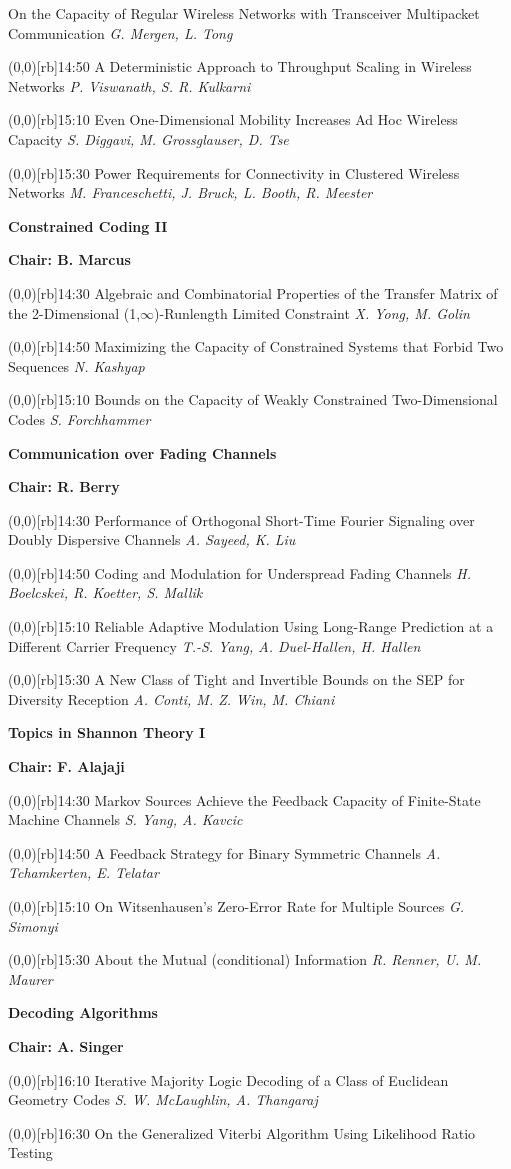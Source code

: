 \documentclass[a5paper,twoside]{article}
\def\period#1{\flushleft{\large\bfseries #1}\markboth{\sf #1}{\sf #1}}
\def\sesstitle#1{\vspace{.45\bigskipamount}\par{\bfseries #1}\par}
\def\sesschair#1{{\bfseries Chair: #1}\par\vspace{.65\medskipamount}}
\def\papertime#1{\makebox(0,0)[rb]{{\scriptsize #1}\hspace{.5em}}}
\def\papertitle#1{#1\hfil\break}
\def\paperauthors#1{{\itshape #1}\par\filbreak\vspace{.65\medskipamount}}
\begin{document}
\papertitle{On the Capacity of Regular Wireless Networks with Transceiver Multipacket Communication}
\paperauthors{G. Mergen, L. Tong}
\papertime{14:50}%
\papertitle{A Deterministic Approach to Throughput Scaling in Wireless Networks}
\paperauthors{P. Viswanath, S. R. Kulkarni}
\papertime{15:10}%
\papertitle{Even One-Dimensional Mobility Increases Ad Hoc Wireless Capacity}
\paperauthors{S. Diggavi, M. Grossglauser, D. Tse}
\papertime{15:30}%
\papertitle{Power Requirements for Connectivity in Clustered Wireless Networks}
\paperauthors{M. Franceschetti, J. Bruck, L. Booth, R. Meester}
\sesstitle{Constrained Coding II}
\sesschair{B. Marcus}
\papertime{14:30}%
\papertitle{Algebraic and Combinatorial Properties of the Transfer Matrix of the 2-Dimensional (1,$\infty$)-Runlength Limited Constraint}
\paperauthors{X. Yong, M. Golin}
\papertime{14:50}%
\papertitle{Maximizing the Capacity of Constrained Systems that Forbid Two Sequences}
\paperauthors{N. Kashyap}
\papertime{15:10}%
\papertitle{Bounds on the Capacity of Weakly Constrained Two-Dimensional Codes}
\paperauthors{S. Forchhammer}
\sesstitle{Communication over Fading Channels}
\sesschair{R. Berry}
\papertime{14:30}%
\papertitle{Performance of Orthogonal Short-Time Fourier Signaling over Doubly Dispersive Channels}
\paperauthors{A. Sayeed, K. Liu}
\papertime{14:50}%
\papertitle{Coding and Modulation for Underspread Fading Channels}
\paperauthors{H. Boelcskei, R. Koetter, S. Mallik}
\papertime{15:10}%
\papertitle{Reliable Adaptive Modulation Using Long-Range Prediction at a Different Carrier Frequency}
\paperauthors{T.-S. Yang, A. Duel-Hallen, H. Hallen}
\papertime{15:30}%
\papertitle{A New Class of Tight and Invertible Bounds on the SEP for Diversity Reception}
\paperauthors{A. Conti, M. Z. Win, M. Chiani}
\sesstitle{Topics in Shannon Theory I}
\sesschair{F. Alajaji}
\papertime{14:30}%
\papertitle{Markov Sources Achieve the Feedback Capacity of Finite-State Machine Channels}
\paperauthors{S. Yang, A. Kavcic}
\papertime{14:50}%
\papertitle{A Feedback Strategy for Binary Symmetric Channels}
\paperauthors{A. Tchamkerten, E. Telatar}
\papertime{15:10}%
\papertitle{On Witsenhausen's Zero-Error Rate for Multiple Sources}
\paperauthors{G. Simonyi}
\papertime{15:30}%
\papertitle{About the Mutual (conditional) Information}
\paperauthors{R. Renner, U. M. Maurer}
\period{Thu 16:10 -- 17:50}
\sesstitle{Decoding Algorithms}
\sesschair{A. Singer}
\papertime{16:10}%
\papertitle{Iterative Majority Logic Decoding of a Class of Euclidean Geometry Codes}
\paperauthors{S. W. McLaughlin, A. Thangaraj}
\papertime{16:30}%
\papertitle{On the Generalized Viterbi Algorithm Using Likelihood Ratio Testing}
\end{document}
